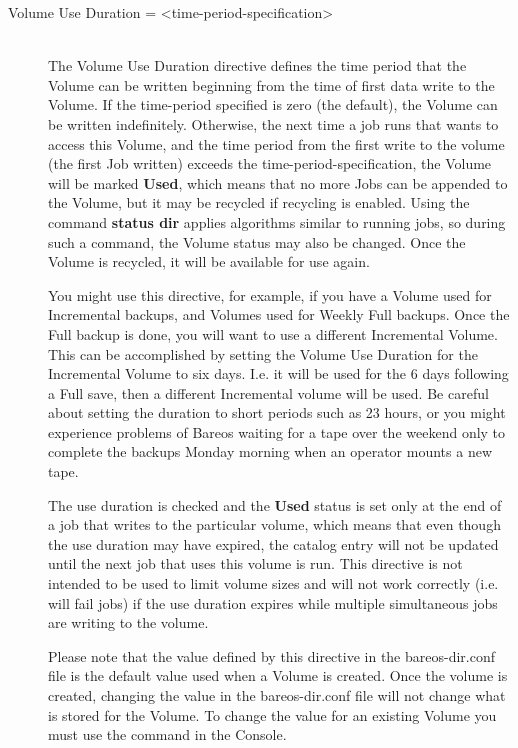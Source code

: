 \begin{description}
\item [Volume Use Duration = {\textless}time-period-specification{\textgreater}] \hfill \\
The Volume Use Duration directive defines the time period that the
Volume can be written beginning from the time of first data write to the
Volume.  If the time-period specified is zero (the default), the Volume
can be written indefinitely.  Otherwise, the next time a job
runs that wants to access this Volume, and the time period from the
first write to the volume (the first Job written) exceeds the
time-period-specification, the Volume will be marked {\bf Used}, which
means that no more Jobs can be appended to the Volume, but it may be
recycled if recycling is enabled. Using the command {\bf
status dir} applies algorithms similar to running jobs, so
during such a command, the Volume status may also be changed.
Once the Volume is
recycled, it will be available for use again.

You might use this directive, for example, if you have a Volume used for
Incremental backups, and Volumes used for Weekly Full backups.  Once the
Full backup is done, you will want to use a different Incremental
Volume.  This can be accomplished by setting the Volume Use Duration for
the Incremental Volume to six days.  I.e.  it will be used for the 6
days following a Full save, then a different Incremental volume will be
used.  Be careful about setting the duration to short periods such as 23
hours, or you might experience problems of Bareos waiting for a tape
over the weekend only to complete the backups Monday morning when an
operator mounts a new tape.

The use duration is checked and the {\bf Used} status is set only at the
end of a job that writes to the particular volume, which means that even
though the use duration may have expired, the catalog entry will not be
updated until the next job that uses this volume is run. This
directive is not intended to be used to limit volume sizes
and will not work correctly (i.e. will fail jobs) if the use
duration expires while multiple simultaneous jobs are writing
to the volume.

Please note that the value defined by this directive in the  bareos-dir.conf
file is the default value used when a Volume  is created. Once the volume is
created, changing the value  in the bareos-dir.conf file will not change what
is stored  for the Volume. To change the value for an existing Volume  you
must use the
 command in the Console.


\end{description}

